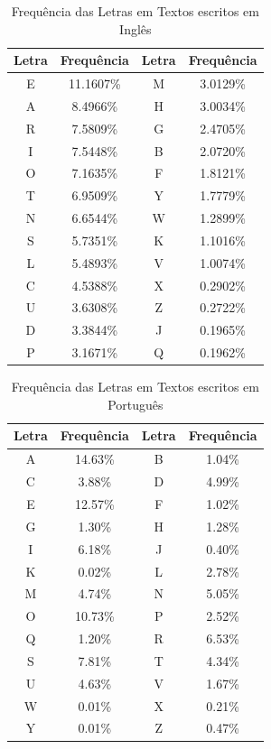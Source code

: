 \documentclass[conference]{IEEEtran}
\begin{document}
\begin{table}[htbp]
\caption{Frequência das Letras em Textos escritos em Inglês}
\begin{center}
\begin{tabular}{|c|c|c|c|}
\hline
    Letra & Frequência & Letra & Frequência \\
\hline
    E & 11.1607\% & M & 3.0129\% \\
    A & 8.4966\% & H & 3.0034\% \\
    R & 7.5809\% & G & 2.4705\% \\
    I & 7.5448\% & B & 2.0720\% \\
    O & 7.1635\% & F & 1.8121\% \\
    T & 6.9509\% & Y & 1.7779\% \\
    N & 6.6544\% & W & 1.2899\% \\
    S & 5.7351\% & K & 1.1016\% \\
    L & 5.4893\% & V & 1.0074\% \\
    C & 4.5388\% & X & 0.2902\% \\
    U & 3.6308\% & Z & 0.2722\% \\
    D & 3.3844\% & J & 0.1965\% \\
    P & 3.1671\% & Q & 0.1962\% \\
\hline
\end{tabular}
\label{tab:englishfrequency}
\end{center}
\end{table}

\begin{table}[htbp]
\caption{Frequência das Letras em Textos escritos em Português}
\begin{center}
\begin{tabular}{|c|c|c|c|}
\hline
    Letra & Frequência & Letra & Frequência \\
\hline
    A & 14.63\% & B & 1.04\% \\
    C & 3.88\% & D & 4.99\% \\
    E & 12.57\% & F & 1.02\% \\
    G & 1.30\% & H & 1.28\% \\
    I & 6.18\% & J & 0.40\% \\
    K & 0.02\% & L & 2.78\% \\
    M & 4.74\% & N & 5.05\% \\
    O & 10.73\% & P & 2.52\% \\
    Q & 1.20\% & R & 6.53\% \\
    S & 7.81\% & T & 4.34\% \\
    U & 4.63\% & V & 1.67\% \\
    W & 0.01\% & X & 0.21\% \\
    Y & 0.01\% & Z & 0.47\% \\
\hline
\end{tabular}
\label{tab:portuguesefrequency}
\end{center}
\end{table}
\end{document}

